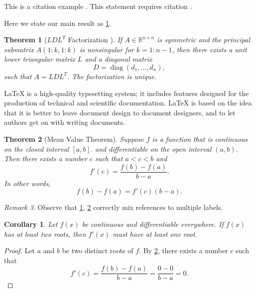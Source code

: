 \documentclass[10pt,reqno,final]{article}
\theoremstyle{plain}
\newtheorem{theorem}{Theorem}[section]
\newtheorem{corollary}{Corollary}[section]
\theoremstyle{definition}
\theoremstyle{remark}
\newtheorem{remark}[theorem]{Remark}
\numberwithin{equation}{section}
\numberwithin{figure}{section}
\numberwithin{table}{section}
\begin{document}
This is a citation example \cite{Adams2003}. This statement requires citation \cite{Shen1994,Tadmor2012,TreWei2014}.

Here we state our main result as \ref{thm:bigthm}.

\begin{theorem}[$LDL^T$ Factorization \cite{GoVa2013}]\label{thm:bigthm}
  If $A \in \mathbb{R}^{n \times n}$ is symmetric and the principal
  submatrix $A(1:k,1:k)$ is nonsingular for $k=1:n-1$, then there
  exists a unit lower triangular matrix $L$ and a diagonal matrix
  \begin{equation*}
    D = \operatorname{diag}(d_1,\dots,d_n),  %
  \end{equation*}
  such that $A=LDL^T$. The factorization is unique.
\end{theorem}

LaTeX is a high-quality typesetting system; it includes features designed for the production of technical and scientific documentation.
LaTeX is based on the idea that it is better to leave document design to document designers, and to let authors get on with writing documents.

\begin{theorem}[Mean Value Theorem]\label{thm:mvt}
  Suppose $f$ is a function that is continuous on the closed interval
  $[a,b]$.  and differentiable on the open interval $(a,b)$.
  Then there exists a number $c$ such that $a < c < b$ and
  \begin{equation*}
    f'(c) = \frac{f(b)-f(a)}{b-a}.
  \end{equation*}
  In other words,
  \begin{equation*}
    f(b)-f(a) = f'(c)(b-a).
  \end{equation*}
\end{theorem}

\begin{remark}
Observe that \ref{thm:bigthm}, \ref{thm:mvt} correctly mix references
to multiple labels.
\end{remark}


\begin{corollary}\label{cor:a}
  Let $f(x)$ be continuous and differentiable everywhere. If $f(x)$
  has at least two roots, then $f'(x)$ must have at least one root.
\end{corollary}
\begin{proof}
  Let $a$ and $b$ be two distinct roots of $f$.
  By \ref{thm:mvt}, there exists a number $c$ such that
  \begin{equation*}
    f'(c) = \frac{f(b)-f(a)}{b-a} = \frac{0-0}{b-a} = 0.
  \end{equation*}
\end{proof}
\end{document}
